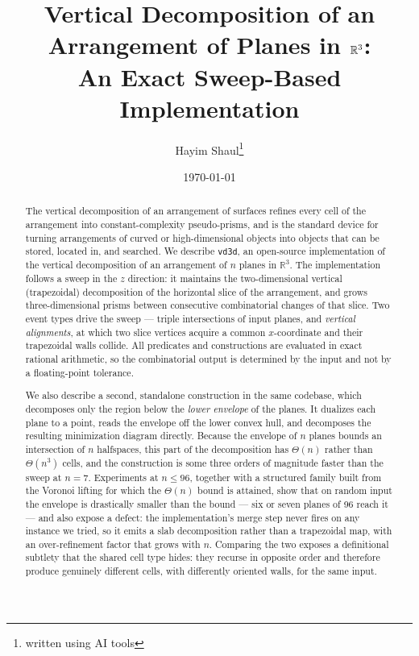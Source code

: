 \documentclass[11pt]{article}
\title{Vertical Decomposition of an Arrangement of Planes in $\R^3$:\\
An Exact Sweep-Based Implementation}
\author{Hayim Shaul\footnote{written using AI tools}}
\date{\today}
\newcommand{\R}{\mathbb{R}}
\begin{document}
\maketitle

\begin{abstract}
The vertical decomposition of an arrangement of surfaces refines every cell of
the arrangement into constant-complexity pseudo-prisms, and is the standard
device for turning arrangements of curved or high-dimensional objects into
objects that can be stored, located in, and searched.  We describe \texttt{vd3d},
an open-source implementation of the vertical decomposition of an arrangement
of $n$ planes in $\R^3$.  The implementation follows a sweep in the $z$
direction: it maintains the two-dimensional vertical (trapezoidal)
decomposition of the horizontal slice of the arrangement, and grows
three-dimensional prisms between consecutive combinatorial changes of that
slice.  Two event types drive the sweep --- triple intersections of input
planes, and \emph{vertical alignments}, at which two slice vertices acquire a
common $x$-coordinate and their trapezoidal walls collide.  All predicates and
constructions are evaluated in exact rational arithmetic, so the combinatorial
output is determined by the input and not by a floating-point tolerance.

We also describe a second, standalone construction in the same codebase, which
decomposes only the region below the \emph{lower envelope} of the planes.  It
dualizes each plane to a point, reads the envelope off the lower convex hull,
and decomposes the resulting minimization diagram directly.  Because the
envelope of $n$ planes bounds an intersection of $n$ halfspaces, this part of
the decomposition has $\Theta(n)$ rather than $\Theta(n^3)$ cells, and the
construction is some three orders of magnitude faster than the sweep at $n = 7$.
Experiments at $n \le 96$, together with a structured family built from the
Voronoi lifting for which the $\Theta(n)$ bound is attained, show that on random
input the envelope is drastically smaller than the bound --- six or seven planes
of 96 reach it --- and also expose a defect: the implementation's merge step
never fires on any instance we tried, so it emits a slab decomposition rather
than a trapezoidal map, with an over-refinement factor that grows with $n$.
Comparing the two exposes a definitional subtlety that the shared cell type
hides: they recurse in opposite order and therefore produce genuinely different
cells, with differently oriented walls, for the same input.


\end{abstract}
\end{document}

